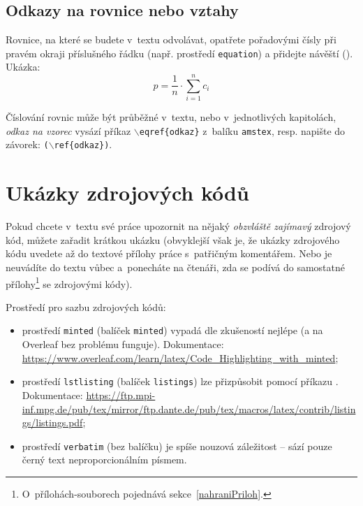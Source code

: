 \subsection{Odkazy na rovnice nebo vztahy}
Rovnice, na které se budete v~textu odvolávat, opatřete pořadovými čísly při pravém okraji příslušného řádku (např. prostředí {\tt equation}) a přidejte návěští (). Ukázka:
\begin{equation}\label{vzorec1}
p = \frac{1}{n}\cdot\sum_{i=1}^n c_i
\end{equation}

Číslování rovnic může být průběžné v~textu, nebo v~jednotlivých kapitolách, {\em odkaz na vzorec\/} vysází příkaz {\tt $\backslash$eqref\{odkaz\}} z~balíku {\tt amstex}, resp. napište  do závorek: {\tt ($\backslash$ref\{odkaz\})}.



\section{Ukázky zdrojových kódů}
Pokud chcete v~textu své práce upozornit na nějaký \textit{obzvláště zajímavý} zdrojový kód, můžete zařadit krátkou ukázku (obvyklejší však je, že ukázky zdrojového kódu uvedete až do textové přílohy práce s~patřičným komentářem. Nebo je neuvádíte do textu vůbec a~ponecháte na čtenáři, zda se podívá do samostatné přílohy\footnote{O~přílohách-souborech pojednává sekce~\ref{nahraniPriloh}.} se zdrojovými kódy).

Prostředí pro sazbu zdrojových kódů:
\begin{itemize}
    \item prostředí {\tt minted} (balíček {\tt minted}) vypadá dle zkušeností nejlépe (a na Overleaf bez problému funguje).
    Dokumentace: \url{https://www.overleaf.com/learn/latex/Code_Highlighting_with_minted};
    \item prostředí {\tt lstlisting} (balíček {\tt listings}) lze přizpůsobit pomocí příkazu . Dokumentace: \url{https://ftp.mpi-inf.mpg.de/pub/tex/mirror/ftp.dante.de/pub/tex/macros/latex/contrib/listings/listings.pdf};
    \item prostředí {\tt verbatim} (bez balíčku) je spíše nouzová záležitost -- sází pouze černý text neproporcionálním písmem.
\end{itemize}





